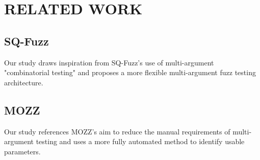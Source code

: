 \section{RELATED WORK}
\label{ch:relatedwork}

\iftrue

\subsection{SQ-Fuzz}




Our study draws inspiration from SQ-Fuzz's use of multi-argument "combinatorial testing" \cite{wu2020sq} and proposes a more flexible multi-argument fuzz testing architecture.

\subsection{MOZZ}
\label{subsec:mozz}



Our study references MOZZ's aim \cite{tsai2024Multiple} to reduce the manual requirements of multi-argument testing and uses a more fully automated method to identify usable parameters.


